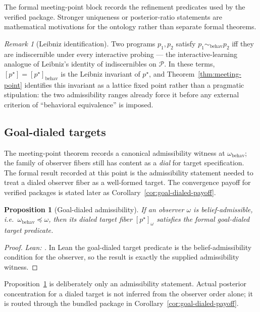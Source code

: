 \documentclass[11pt]{article}
\newtheorem{proposition}[theorem]{Proposition}
\theoremstyle{definition}
\theoremstyle{remark}
\newtheorem{remark}[theorem]{Remark}
\theoremstyle{plain}
\theoremstyle{definition}
\newcommand{\Pcal}{\mathcal{P}}
\begin{document}
The formal meeting-point block records the refinement predicates used by the verified package. Stronger uniqueness or posterior-ratio statements are mathematical motivations for the ontology rather than separate formal theorems.

\begin{remark}[Leibniz identification]
\label{rem:leibniz}
Two programs $p_1,p_2$ satisfy $p_1\sim_{\mathrm{behav}}p_2$ iff they are indiscernible under every interactive probing --- the interactive-learning analogue of Leibniz's identity of indiscernibles on $\Pcal$. In these terms, $[p^\star]=[p^\star]_{\mathrm{behav}}$ is the Leibniz invariant of $p^\star$, and Theorem~\ref{thm:meeting-point} identifies this invariant as a lattice fixed point rather than a pragmatic stipulation: the two admissibility ranges already force it before any external criterion of ``behavioral equivalence'' is imposed.
\end{remark}

\subsection{Goal-dialed targets}
\label{sec:goal-dialed}

The meeting-point theorem records a canonical admissibility witness at $\omega_{\mathrm{behav}}$; the family of observer fibers still has content as a \emph{dial} for target specification. The formal result recorded at this point is the admissibility statement needed to treat a dialed observer fiber as a well-formed target. The convergence payoff for verified packages is stated later as Corollary~\ref{cor:goal-dialed-payoff}.

\begin{proposition}[Goal-dialed admissibility]
\label{prop:goal-dialed}
If an observer $\omega$ is belief-admissible, i.e.\ $\omega_{\mathrm{behav}}\preceq\omega$, then its dialed target fiber $[p^\star]_\omega$ satisfies the formal goal-dialed target predicate.
\end{proposition}

\begin{proof}
\noindent\emph{Lean: .}
In Lean the goal-dialed target predicate is the belief-admissibility condition for the observer, so the result is exactly the supplied admissibility witness.
\end{proof}

Proposition~\ref{prop:goal-dialed} is deliberately only an admissibility statement. Actual posterior concentration for a dialed target is not inferred from the observer order alone; it is routed through the bundled package in Corollary~\ref{cor:goal-dialed-payoff}.
\end{document}
